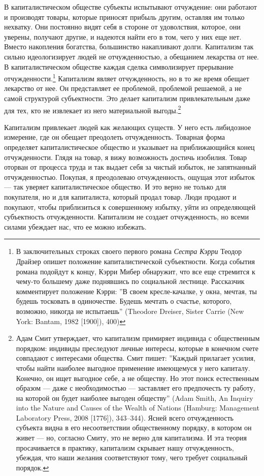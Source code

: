 \documentclass[12pt]{book}
\begin{document}
В капиталистическом обществе субъекты испытывают отчуждение: они работают и производят товары, которые приносят прибыль другим, оставляя им только нехватку. Они постоянно видят себя в стороне от удоволствия, которое, они уверены, получают другие, и надеются найти его в том, чего у них еще нет. Вместо накопления богатства, большинство накапливают долги. Капитализм так сильно идеологизирует людей не отчужденностью, а обещанием лекарства от нее. В капиталистическом обществе каждая сделка символизирует прерывание отчужденности.\footnote{В заключительных строках своего первого романа \textit{Сестра Кэрри} Теодор Драйзер опишет положение капиталистической субъектности. Когда события романа подойдут к концу, Кэрри Мибер обнаружит, что все еще стремится к чему-то большему даже поднявшись по социальной лестнице. Рассказчик комментирует положение Кэрри: ''В своем кресле-качалке, у окна, мечтая, ты будешь тосковать в одиночестве. Будешь мечтать о счастье, которого, возможно, никогда не испытаешь'' (Theodore Dreiser, Sister Carrie (New York: Bantam, 1982 [1900]), 400)} Капитализм являет отчужденность, но в то же время обещает лекарство от нее. Он представляет ее проблемой, проблемой решаемой, а не самой структурой субъектности. Это делает капитализм привлекательным даже для тех, кто не извлекает из него материальной выгоды.\footnote{Адам Смит утверждает, что капитализм примиряет индивида с общественным порядком: индивиды преследуют личные интересы, которые в конечном счете совпадают с интересами общества. Смит пишет: ''Каждый прилагает усилия, чтобы найти наиболее выгодное применение имеющемуся у него капиталу. Конечно, он ищет выгодное себе, а не обществу. Но этот поиск естественным образом --- даже с необходимостью --- заставляет его предпочесть ту работу, на которой он будет наиболее выгоден обществу'' (Adam Smith, An Inquiry into the Nature and Causes of the Wealth of Nations (Hamburg: Management Laboratory Press, 2008 [1776]), 343–344). Ясней всего отчужденность субъекта видна в его несоответствии общественному порядку, в котором он живет --- но, согласно Смиту, это не верно для капитализма. И эта теория просачивается в практику, капитализм скрывает нашу отчужденность, убеждая, что наши желания соответствуют тому, чего требует социальный порядок.}

Капитализм привлекает людей как желающих существ. У него есть либидозное измерение, где он обещает преодолеть отчужденность. Товарная форма определяет капиталистическое общество и указывает на приближающийся конец отчужденности. Глядя на товар, я вижу возможность достичь изобилия. Товар оторван от процесса труда и так выдает себя за чистый избыток, не запятнанный отчужденностью. Покупая, я преодолеваю отчужденность, ощущая этот избыток --- так уверяет капиталистическое общество. И это верно не только для покупателя, но и для капиталиста, который продал товар. Люди продают и покупают, чтобы приблизиться к совершенному избытку, уйти из определяющей субъектность отчужденности. Капитализм не создает отчужденность, но всеми силами убеждает нас, что ее можно избежать.
\end{document}
